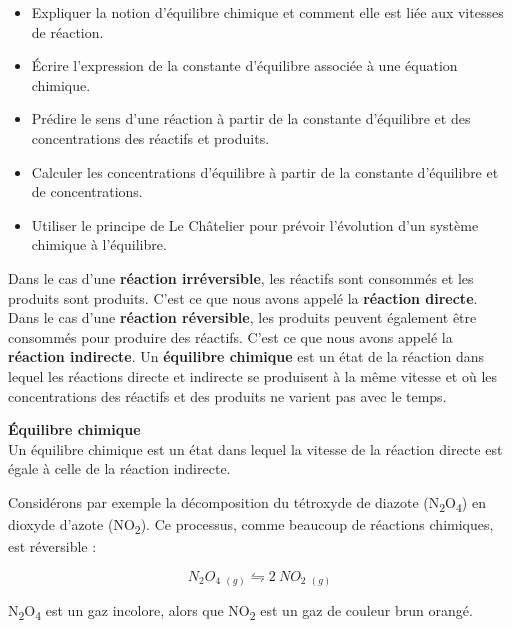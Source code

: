 \documentclass[
  11pt,
  a4paper,
  openany]{book}
\providecommand{\tightlist}{%
  \setlength{\itemsep}{0pt}\setlength{\parskip}{0pt}}
\begin{document}
\begin{objectives}

\begin{itemize}
\tightlist
\item
  Expliquer la notion d'équilibre chimique et comment elle est liée aux vitesses de réaction.
\item
  Écrire l'expression de la constante d'équilibre associée à une équation chimique.
\item
  Prédire le sens d'une réaction à partir de la constante d'équilibre et des concentrations des réactifs et produits.
\item
  Calculer les concentrations d'équilibre à partir de la constante d'équilibre et de concentrations.
\item
  Utiliser le principe de Le Châtelier pour prévoir l'évolution d'un système chimique à l'équilibre.
\end{itemize}

\end{objectives}

Dans le cas d'une \textbf{réaction irréversible}, les réactifs sont consommés et les produits sont produits. C'est ce que nous avons appelé la \textbf{réaction directe}. Dans le cas d'une \textbf{réaction réversible}, les produits peuvent également être consommés pour produire des réactifs. C'est ce que nous avons appelé la \textbf{réaction indirecte}. Un \textbf{équilibre chimique} est un état de la réaction dans lequel les réactions directe et indirecte se produisent à la même vitesse et où les concentrations des réactifs et des produits ne varient pas avec le temps.

\begin{tcolorbox}
\textbf{Équilibre chimique}\\
Un équilibre chimique est un état dans lequel la vitesse de la réaction directe est égale à celle de la réaction indirecte.

\end{tcolorbox}

Considérons par exemple la décomposition du tétroxyde de diazote (N\textsubscript{2}O\textsubscript{4}) en dioxyde d'azote (NO\textsubscript{2}). Ce processus, comme beaucoup de réactions chimiques, est réversible :

\[
  N_2O_4\ {}_{(g)} \leftrightharpoons 2\ NO_2\ {}_{(g)}
\]

N\textsubscript{2}O\textsubscript{4} est un gaz incolore, alors que NO\textsubscript{2} est un gaz de couleur brun orangé.
\end{document}
